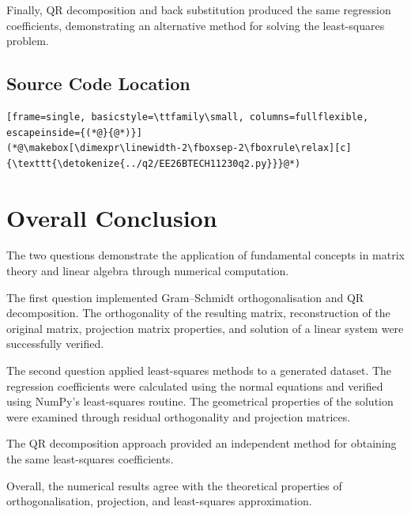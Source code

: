 \documentclass[12pt,a4paper]{article}
\numberwithin{equation}{section}
\begin{document}
Finally, QR decomposition and back substitution
produced the same regression coefficients,
demonstrating an alternative method for solving
the least-squares problem.

\subsection{Source Code Location}

\begin{lstlisting}[frame=single, basicstyle=\ttfamily\small, columns=fullflexible, escapeinside={(*@}{@*)}]
(*@\makebox[\dimexpr\linewidth-2\fboxsep-2\fboxrule\relax][c]{\texttt{\detokenize{../q2/EE26BTECH11230q2.py}}}@*)
\end{lstlisting}


\newpage

\section{Overall Conclusion}

The two questions demonstrate the application
of fundamental concepts in matrix theory and
linear algebra through numerical computation.

The first question implemented Gram--Schmidt
orthogonalisation and QR decomposition. The
orthogonality of the resulting matrix, reconstruction
of the original matrix, projection matrix properties,
and solution of a linear system were successfully
verified.

The second question applied least-squares methods
to a generated dataset. The regression coefficients
were calculated using the normal equations and
verified using NumPy's least-squares routine.
The geometrical properties of the solution were
examined through residual orthogonality and
projection matrices.

The QR decomposition approach provided an
independent method for obtaining the same
least-squares coefficients.

Overall, the numerical results agree with the
theoretical properties of orthogonalisation,
projection, and least-squares approximation.


\newpage
\end{document}
